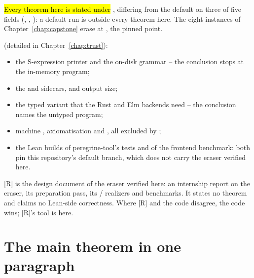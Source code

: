 \par\smallskip\noindent
\hl{Every theorem here is stated under }, differing from the default on three of
five fields (, , ): a default  run is outside every
theorem here. The eight instances of Chapter~\ref{chap:capstone} erase at ,
the pinned point.

 (detailed in Chapter~\ref{chap:trust}):
\begin{itemize}
\item the S-expression printer and the on-disk  grammar -- the conclusion stops at the
in-memory program;
\item the  and  sidecars, and output size;
\item the typed variant \lboxT{} that the Rust and Elm backends need -- the conclusion names the
untyped program;
\item machine ,  axiomatisation and , all excluded by
;
\item the Lean builds of peregrine-tool's tests and of the frontend benchmark: both pin this
repository's default branch, which does not carry the eraser verified here.
\end{itemize}

\begin{remark}
 [R] is the design document of the eraser verified here: an internship report on the eraser,
its preparation pass, its / realizers and benchmarks. It states no theorem and
claims no Lean-side correctness. Where [R] and the code disagree, the code wins; [R]'s tool
 is  here.
\end{remark}

\section{The main theorem in one paragraph}
\label{sec:intro:theorem}


